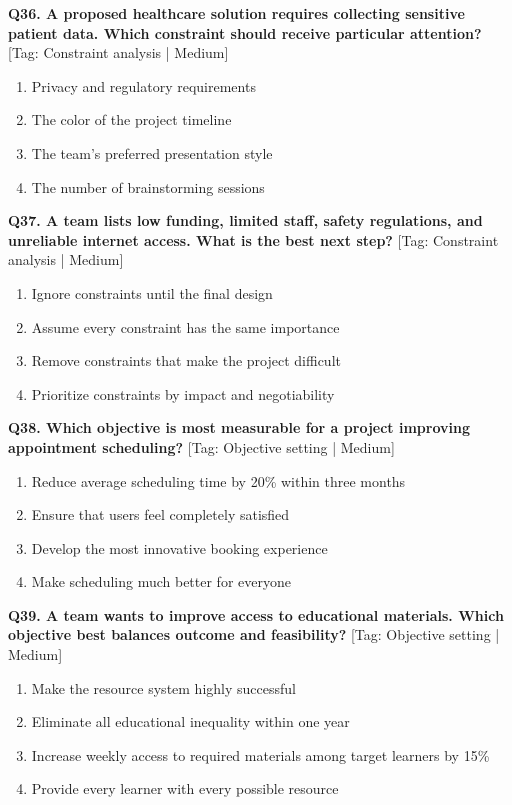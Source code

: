 \noindent\textbf{Q36. A proposed healthcare solution requires collecting sensitive patient data. Which constraint should receive particular attention?} \hfill [Tag: Constraint analysis | Medium]
\begin{enumerate}[label=(\alph*),topsep=2pt,itemsep=1pt,partopsep=0pt,parsep=0pt]
    \item {Privacy and regulatory requirements}
    \item {The color of the project timeline}
    \item {The team's preferred presentation style}
    \item {The number of brainstorming sessions}
\end{enumerate}
\vspace{2mm}

\noindent\textbf{Q37. A team lists low funding, limited staff, safety regulations, and unreliable internet access. What is the best next step?} \hfill [Tag: Constraint analysis | Medium]
\begin{enumerate}[label=(\alph*),topsep=2pt,itemsep=1pt,partopsep=0pt,parsep=0pt]
    \item {Ignore constraints until the final design}
    \item {Assume every constraint has the same importance}
    \item {Remove constraints that make the project difficult}
    \item {Prioritize constraints by impact and negotiability}
\end{enumerate}
\vspace{2mm}

\noindent\textbf{Q38. Which objective is most measurable for a project improving appointment scheduling?} \hfill [Tag: Objective setting | Medium]
\begin{enumerate}[label=(\alph*),topsep=2pt,itemsep=1pt,partopsep=0pt,parsep=0pt]
    \item {Reduce average scheduling time by 20\% within three months}
    \item {Ensure that users feel completely satisfied}
    \item {Develop the most innovative booking experience}
    \item {Make scheduling much better for everyone}
\end{enumerate}
\vspace{2mm}

\noindent\textbf{Q39. A team wants to improve access to educational materials. Which objective best balances outcome and feasibility?} \hfill [Tag: Objective setting | Medium]
\begin{enumerate}[label=(\alph*),topsep=2pt,itemsep=1pt,partopsep=0pt,parsep=0pt]
    \item {Make the resource system highly successful}
    \item {Eliminate all educational inequality within one year}
    \item {Increase weekly access to required materials among target learners by 15\%}
    \item {Provide every learner with every possible resource}
\end{enumerate}
\vspace{2mm}

